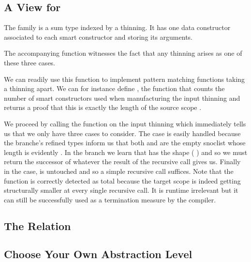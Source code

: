 \documentclass{article}
\begin{document}
\subsection{A View for }

The  family is a sum type indexed by a thinning. It has one
data constructor associated to each smart constructor and storing its arguments.


The accompanying  function witnesses the fact that any
thinning arises as one of these three cases.


We can readily use this function to implement pattern matching functions taking
a thinning apart. We can for instance define , the function
that counts the number of  smart constructors used when
manufacturing the input thinning and returns a proof that this is exactly the
length of the source scope .


We proceed by calling the  function on the input thinning
which immediately tells us that we only have three cases to consider.
%
The  case is easily handled because the branche's refined
types inform us that both  and  are the
empty snoclist \IdrisData{[<]} whose length is evidently .
%
In the  branch we learn that  has the shape
(\IdrisBound{\KatlaUnderscore} \IdrisData{:<} ) and so we must return the
successor of whatever the result of the recursive call gives us.
%
Finally in the  case,  is untouched and so a
simple recursive call suffices.
%
Note that the function is correctly detected as total because the target scope
 is indeed getting structurally smaller at every single recursive
call.
%
It is runtime irrelevant but it can still be successfully used as a termination
measure by the compiler.

\subsection{The  Relation}


\subsection{Choose Your Own Abstraction Level}
\end{document}
